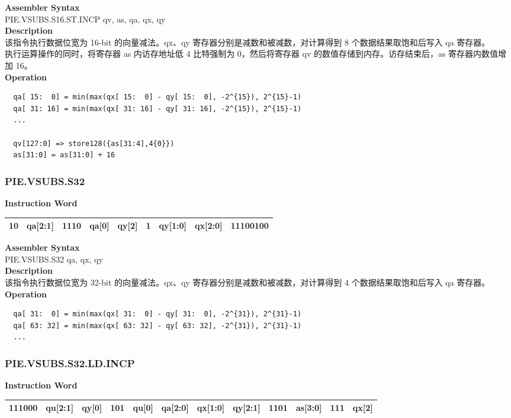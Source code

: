 \textbf{Assembler Syntax} \\
PIE.VSUBS.S16.ST.INCP qv, as, qa, qx, qy \\
\textbf{Description} \\
该指令执行数据位宽为 16-bit 的向量减法。qx、qy 寄存器分别是减数和被减数，对计算得到 8 个数据结果取饱和后写入 qa 寄存器。\\ 执行运算操作的同时，将寄存器 as 内访存地址低 4 比特强制为 0，然后将寄存器 qv 的数值存储到内存。访存结束后，as 寄存器内数值增加 16。\\
\textbf{Operation}
\begin{lstlisting}
  qa[ 15:  0] = min(max(qx[ 15:  0] - qy[ 15:  0], -2^{15}), 2^{15}-1)
  qa[ 31: 16] = min(max(qx[ 31: 16] - qy[ 31: 16], -2^{15}), 2^{15}-1)
  ...

  qv[127:0] => store128({as[31:4],4{0}})
  as[31:0] = as[31:0] + 16
\end{lstlisting}

\newpage
\subsubsection{PIE.VSUBS.S32}\label{instruction:PIEVSUBSS32}
\setlength\tabcolsep{6pt}
\textbf{Instruction Word} \\
\begin{tabular}{|c|c|c|c|c|c|c|c|c|}
	\hline
	10 & qa[2:1] & 1110 & qa[0] & qy[2] & 1 & qy[1:0] & qx[2:0] & 11100100 \\
	\hline
\end{tabular}

\textbf{Assembler Syntax} \\
PIE.VSUBS.S32 qa, qx, qy \\
\textbf{Description} \\
该指令执行数据位宽为 32-bit 的向量减法。qx、qy 寄存器分别是减数和被减数，对计算得到 4 个数据结果取饱和后写入 qa 寄存器。\\
\textbf{Operation}
\begin{lstlisting}
  qa[ 31:  0] = min(max(qx[ 31:  0] - qy[ 31:  0], -2^{31}), 2^{31}-1)
  qa[ 63: 32] = min(max(qx[ 63: 32] - qy[ 63: 32], -2^{31}), 2^{31}-1)
  ...
\end{lstlisting}

\newpage
\subsubsection{PIE.VSUBS.S32.LD.INCP}\label{instruction:PIEVSUBSS32LDINCP}
\setlength\tabcolsep{6pt}
\textbf{Instruction Word} \\
\begin{tabular}{|c|c|c|c|c|c|c|c|c|c|c|c|}
	\hline
	111000 & qu[2:1] & qy[0] & 101 & qu[0] & qa[2:0] & qx[1:0] & qy[2:1] & 1101 & as[3:0] & 111 & qx[2] \\
	\hline
\end{tabular}

